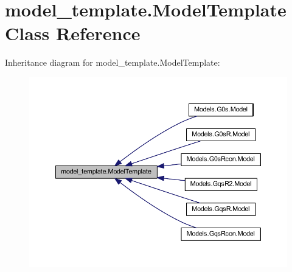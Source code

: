 \hypertarget{classmodel__template_1_1_model_template}{\section{model\-\_\-template.\-Model\-Template Class Reference}
\label{classmodel__template_1_1_model_template}
}


Inheritance diagram for model\-\_\-template.\-Model\-Template\-:
\nopagebreak
\begin{figure}[H]
\begin{center}
\leavevmode
\includegraphics[width=350pt]{classmodel__template_1_1_model_template__inherit__graph}
\end{center}
\end{figure}
